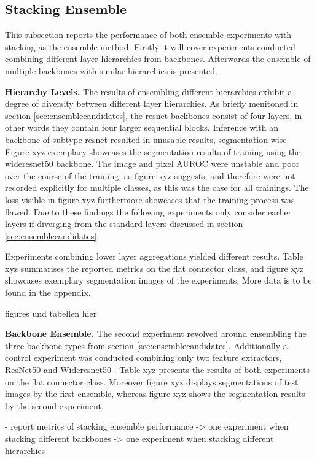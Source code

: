 \subsection{Stacking Ensemble}
\label{subsec:stacking}

This subsection reports the performance of both ensemble experiments with stacking as the ensemble method. Firstly it will cover experiments conducted combining different layer 
hierarchies from backbones. Afterwards the ensemble of multiple backbones with similar hierarchies is presented.

\textbf{Hierarchy Levels.} The results of ensembling different hierarchies exhibit a degree of diversity between different layer hierarchies. As briefly menitoned in section \ref{sec:ensemblecandidates}, the resnet backbones consist of four 
layers, in other words they contain four larger sequential blocks. Inference with an backbone of subtype resnet resulted in unusable results, segmentation wise. 
Figure xyz exemplary showcases the segmentation results of training using the wideresnet50 backbone. The image and pixel AUROC were unstable and poor over the course of the training, 
as figure xyz suggests, and therefore were not recorded explicitly for multiple classes, as this was the case for all trainings. The loss visible in figure xyz furthermore 
showcases that the training process was flawed. Due to these findings the following experiments only consider earlier layers if diverging from the standard layers 
discussed in section \ref{sec:ensemblecandidates}.


Experiments combining lower layer aggregations yielded different results. Table xyz summarises the reported metrics on the flat connector class, and figure xyz showcases exemplary 
segmentation images of the experiments. More data is to be found in the appendix.

figures und tabellen hier



\textbf{Backbone Ensemble.} The second experiment revolved around ensembling the three backbone types from section \ref{sec:ensemblecandidates}. Additionally a control experiment was 
conducted combining only two feature extractors, ResNet50 \cite{He_2016resnet} and Wideresnet50 \cite{wideresnet}. Table xyz presents the results of both experiments on the flat 
connector class. %
Moreover figure xyz displays segmentations of test images by the first ensemble, whereas figure xyz shows the segmentation results by the second experiment.



- report metrics of stacking ensemble performance\newline
-> one experiment when stacking different backbones\newline
-> one experiment when stacking different hierarchies\newline


